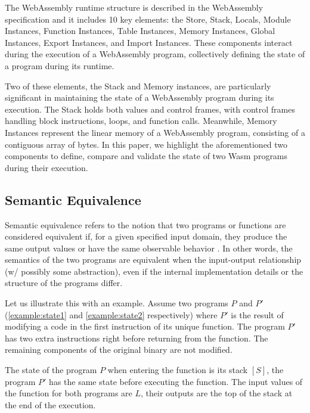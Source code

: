 \documentclass[sigplan,screen]{acmart}
\newcommand*\badge[1]{ \colorbox{red}{\color{white}#1}}
\newcommand{\todo}[1]{%
\refstepcounter{todo}
\noindent\textbf{\badge{TODO}} {\color{red}#1}
\addcontentsline{td}{todo}
{\color{red}\thesection.\thetodo\xspace #1}}
\begin{document}

The WebAssembly runtime structure is described in the WebAssembly specification and it includes 10 key elements: the Store, Stack, Locals, Module Instances, Function Instances, Table Instances, Memory Instances, Global Instances, Export Instances, and Import Instances. These components interact during the execution of a WebAssembly program, collectively defining the state of a program during its runtime.

Two of these elements, the Stack and Memory instances, are particularly significant in maintaining the state of a WebAssembly program during its execution. The Stack holds both values and control frames, with control frames handling block instructions, loops, and function calls. Meanwhile, Memory Instances represent the linear memory of a WebAssembly program, consisting of a contiguous array of bytes.
In this paper, we highlight the aforementioned two components to define, compare and validate the state of two Wasm programs during their execution. 

\subsection{Semantic Equivalence}

Semantic equivalence refers to the notion that two programs or functions are considered equivalent if, for a given specified input domain, they produce the same output values or have the same observable behavior \cite{10.1145/2594291.2594334}. 
In other words, the semantics of the two programs are equivalent when the input-output relationship (w/ possibly some abstraction), even if the internal implementation details or the structure of the programs differ.


Let us illustrate this with an example.
Assume two programs $P$ and $P'$ (\autoref{example:state1} and \autoref{example:state2} respectively) where $P'$ is the result of modifying a code in the first instruction of its unique function.
The program $P'$ has two extra instructions right before returning from the function.
The remaining components of the original binary are not modified.




The state of the program $P$ when entering the function is its stack $[S]$, 
the program $P'$ has the same state before executing the function.
The input values of the function for both programs are $L$, their outputs are the top of the stack at the end of the execution.
\end{document}

